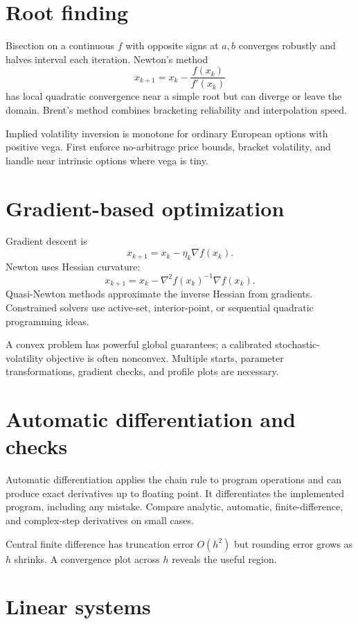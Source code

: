 \section{Root finding}

Bisection on a continuous $f$ with opposite signs at $a,b$ converges robustly and
halves interval each iteration. Newton's method
\[
x_{k+1}=x_k-\frac{f(x_k)}{f'(x_k)}
\]
has local quadratic convergence near a simple root but can diverge or leave the
domain. Brent's method combines bracketing reliability and interpolation speed.

Implied volatility inversion is monotone for ordinary European options with positive
vega. First enforce no-arbitrage price bounds, bracket volatility, and handle near
intrinsic options where vega is tiny.

\section{Gradient-based optimization}

Gradient descent is
\[
x_{k+1}=x_k-\eta_k\nabla f(x_k).
\]
Newton uses Hessian curvature:
\[
x_{k+1}=x_k-\nabla^2f(x_k)^{-1}\nabla f(x_k).
\]
Quasi-Newton methods approximate the
inverse Hessian from gradients. Constrained solvers use active-set, interior-point,
or sequential quadratic programming ideas.

A convex problem has powerful global guarantees; a calibrated stochastic-volatility
objective is often nonconvex. Multiple starts, parameter transformations, gradient
checks, and profile plots are necessary.

\section{Automatic differentiation and checks}

Automatic differentiation applies the chain rule to program operations and can
produce exact derivatives up to floating point. It differentiates the implemented
program, including any mistake. Compare analytic, automatic, finite-difference, and
complex-step derivatives on small cases.

Central finite difference has truncation error $O(h^2)$ but rounding error grows as
$h$ shrinks. A convergence plot across $h$ reveals the useful region.

\section{Linear systems}

